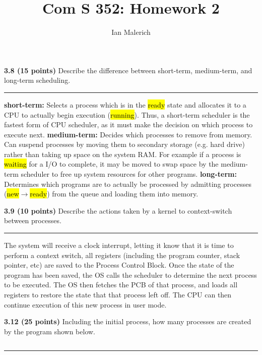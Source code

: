 \documentclass[12pt]{jhwhw}
\author{Ian Malerich}
\title{Com S 352: Homework 2}
\begin{document}
\raggedright

\textbf{3.8 (15 points)} Describe the difference between short-term, medium-term, and 
	long-term scheduling.
\textcolor[RGB]{240,240,240}{\rule{\textwidth}{0.5pt}}\bigbreak

	\begin{addmargin}[1em]{}
		\textbf{short-term:} Selects a process which is in the \hl{ready} state 
			and allocates it to a CPU to actually begin execution (\hl{running}). 
			Thus, a short-term scheduler is the fastest form of CPU scheduler, 
			as it must make the decision on which process to execute next.
		\bigbreak
		\textbf{medium-term:} Decides which processes to remove from memory.
			Can suspend processes by moving them to secondary storage (e.g. 
			hard drive) rather than taking up space on the system RAM.
			For example if a process is \hl{waiting} for a I/O to complete,
			it may be moved to swap space by the medium-term scheduler to free
			up system resources for other programs.
		\bigbreak
		\textbf{long-term:} Determines which programs are to actually be processed
			by admitting processes (\hl{new}$\rightarrow$\hl{ready})
			from the queue and loading them into memory.
	\end{addmargin}

\bigbreak
\textbf{3.9 (10 points)} Describe the actions taken by a kernel to context-switch
	between processes.
\textcolor[RGB]{240,240,240}{\rule{\textwidth}{0.5pt}}\bigbreak

	\begin{addmargin}[1em]{}
		The system will receive a clock interrupt, letting it know that it is time
		to perform a context switch, all registers (including the program counter, stack
		pointer, etc) are saved to the Process Control Block. Once the state of the program 
		has been saved, the OS calls the scheduler to determine the next process to be
		executed. The OS then fetches the PCB of that process, and loads all registers
		to restore the state that that process left off. The CPU can then continue
		execution of this new process in user mode.
	\end{addmargin}

\bigbreak
\textbf{3.12 (25 points)} Including the initial process, how many processes are created by 
	the program shown below.
\inputminted{c}{3.12.c}
\textcolor[RGB]{240,240,240}{\rule{\textwidth}{0.5pt}}\bigbreak
\end{document}
